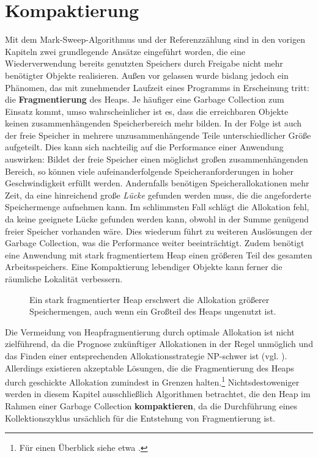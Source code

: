 \chapter{Kompaktierung}
\label{cha:compacting}
Mit dem Mark-Sweep-Algorithmus und der Referenzzählung sind in den vorigen Kapiteln zwei grundlegende Ansätze eingeführt worden, die eine Wiederverwendung bereits genutzten Speichers durch Freigabe nicht mehr benötigter Objekte realisieren.
Außen vor gelassen wurde bislang jedoch ein Phänomen, das mit zunehmender Laufzeit eines Programms in Erscheinung tritt:
die \textbf{Fragmentierung} des Heaps.
Je häufiger eine Garbage Collection zum Einsatz kommt, umso wahrscheinlicher ist es, dass die erreichbaren Objekte keinen zusammenhängenden Speicherbereich mehr bilden.
In der Folge ist auch der freie Speicher in mehrere unzusammenhängende Teile unterschiedlicher Größe aufgeteilt.
Dies kann sich nachteilig auf die Performance einer Anwendung auswirken:
Bildet der freie Speicher einen möglichst großen zusammenhängenden Bereich, so können viele aufeinanderfolgende Speicheranforderungen in hoher Geschwindigkeit erfüllt werden.
Andernfalls benötigen Speicherallokationen mehr Zeit, da eine hinreichend große \textit{Lücke} gefunden werden muss, die die angeforderte Speichermenge aufnehmen kann.
Im schlimmsten Fall schlägt die Allokation fehl, da keine geeignete Lücke gefunden werden kann, obwohl in der Summe genügend freier Speicher vorhanden wäre.
Dies wiederum führt zu weiteren Auslösungen der Garbage Collection, was die Performance weiter beeinträchtigt.
Zudem benötigt eine Anwendung mit stark fragmentiertem Heap einen größeren Teil des gesamten Arbeitsspeichers.
Eine Kompaktierung lebendiger Objekte kann ferner die räumliche Lokalität verbessern.

\begin{figure}[h]
	\centering
	
	\caption[Fragmentierter Heap]{Ein stark fragmentierter Heap erschwert die Allokation größerer Speichermengen, auch wenn ein Großteil des Heaps ungenutzt ist.}
	\label{fig:fragmentation}
\end{figure}

Die Vermeidung von Heapfragmentierung durch optimale Allokation ist nicht zielführend, da die Prognose zukünftiger Allokationen in der Regel unmöglich und das Finden einer entsprechenden Allokationsstrategie NP-schwer ist (vgl. \cite{robson1980}).
Allerdings existieren akzeptable Lösungen, die die Fragmentierung des Heaps durch geschickte Allokation zumindest in Grenzen halten.\footnote{Für einen Überblick siehe etwa \cite[Kap. 7]{handbook}.}
Nichtsdestoweniger werden in diesem Kapitel ausschließlich Algorithmen betrachtet, die den Heap im Rahmen einer Garbage Collection \textbf{kompaktieren}, da die Durchführung eines Kollektionszyklus ursächlich für die Entstehung von Fragmentierung ist.

